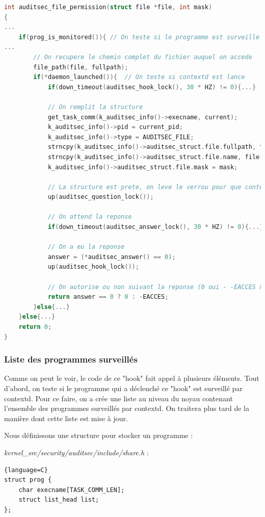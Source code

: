 \documentclass[pdftex,a4paper,titlepage,11pt]{article}
\begin{document}
\begin{lstlisting}[language=C]
int auditsec_file_permission(struct file *file, int mask)
{
...
	if(prog_is_monitored()){ // On teste si le programme est surveille
...
		// On recupere le chemin complet du fichier auquel on accede
		file_path(file, fullpath);
		if(*daemon_launched()){  // On teste si contextd est lance
			if(down_timeout(auditsec_hook_lock(), 30 * HZ) != 0){...}
			
			// On remplit la structure
			get_task_comm(k_auditsec_info()->execname, current);
			k_auditsec_info()->pid = current_pid;
			k_auditsec_info()->type = AUDITSEC_FILE;
			strncpy(k_auditsec_info()->auditsec_struct.file.fullpath, fullpath, PATH_MAX + 1);
			strncpy(k_auditsec_info()->auditsec_struct.file.name, file->f_path.dentry->d_name.name, NAME_MAX + 1);
			k_auditsec_info()->auditsec_struct.file.mask = mask;
			
			// La structure est prete, on leve le verrou pour que contextd puisse la recuperer
			up(auditsec_question_lock());
			
			// On attend la reponse
			if(down_timeout(auditsec_answer_lock(), 30 * HZ) != 0){...}
			
			// On a eu la reponse			
			answer = (*auditsec_answer() == 0);
			up(auditsec_hook_lock());

			// On autorise ou non suivant la reponse (0 oui - -EACCES non)
			return answer == 0 ? 0 : -EACCES;
		}else{...}
	}else{...}
	return 0;
}
\end{lstlisting}

\subsubsection{Liste des programmes surveillés}

Comme on peut le voir, le code de ce "hook" fait appel à plusieurs éléments. Tout d'abord, on teste si le programme qui a déclenché ce "hook" est surveillé par contextd. Pour ce faire, on a crée une liste au niveau du noyau contenant l'ensemble des programmes surveillés par contextd. On traitera plus tard de la manière dont cette liste est mise à jour.

Nous définissons une structure pour stocker un programme :

\textit{{kernel\_src}/security/auditsec/include/share.h} :
\begin{lstlisting}{language=C}
struct prog {
	char execname[TASK_COMM_LEN];
	struct list_head list;
};
\end{lstlisting}
\end{document}
